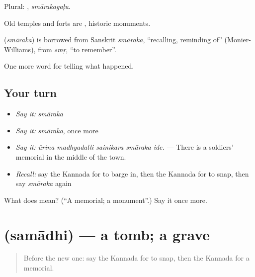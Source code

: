 Plural: , \emph{smārakagaḷu}.

Old temples and forts are  , historic monuments.

\begin{cousinweb}
\textbf{} (\emph{smāraka}) is borrowed from Sanskrit \emph{smāraka}, \textquotedblleft{}recalling, reminding of\textquotedblright{} (Monier-Williams), from \emph{smṛ}, \textquotedblleft{}to remember\textquotedblright{}.
\end{cousinweb}

\begin{grammarlens}[title={What you've built}]
One more word for telling what happened.
\end{grammarlens}

\subsection*{Your turn}
\begin{itemize}
\raggedright
  \item \emph{Say it:} \emph{smāraka}
  \item \emph{Say it:} \emph{smāraka}, once more
  \item \emph{Say it:} \emph{ūrina madhyadalli sainikara smāraka ide.} — There is a soldiers' memorial in the middle of the town.
  \item \emph{Recall:} say the Kannada for to barge in, then the Kannada for to snap, then say \emph{smāraka} again
\end{itemize}

\begin{tcolorbox}[breakable,colback=teal!4,colframe=teal!35!black,title={Before you move on}]
What does  mean? (\textquotedblleft{}A memorial; a monument\textquotedblright{}.) Say it once more.
\end{tcolorbox}
\section[\texorpdfstring{\kn{ಸಮಾಧಿ} (samādhi)}{ಸಮಾಧಿ (samādhi)}]{ (samādhi) — a tomb; a grave}

\label{lesson:KA-C361-samadhi}



\begin{quote}
Before the new one: say the Kannada for to snap, then the Kannada for a memorial.
\end{quote}

